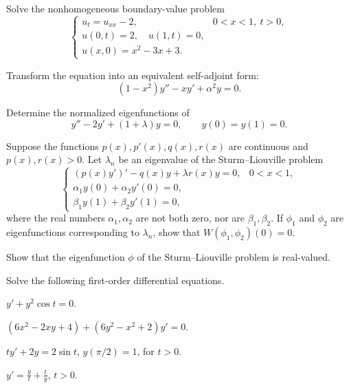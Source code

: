 \documentclass[11pt,oneside]{article}
\begin{document}
\begin{problem}
Solve the nonhomogeneous boundary-value problem
\[\begin{cases}u_t=u_{xx}-2,&0<x<1,\ t>0,\\u(0,t)=2,\quad u(1,t)=0,\\u(x,0)=x^2-3x+3.\end{cases}\]
\end{problem}

\begin{problem}
\begin{problemsubparts}
\item Transform the equation into an equivalent self-adjoint form:
\[(1-x^2)y''-xy'+\alpha^2y=0.\]
\item Determine the normalized eigenfunctions of
\[y''-2y'+(1+\lambda)y=0,\qquad y(0)=y(1)=0.\]
\end{problemsubparts}
\end{problem}

\begin{problem}
\begin{problemsubparts}
\item Suppose the functions $p(x),p'(x),q(x),r(x)$ are continuous and $p(x),r(x)>0$. Let $\lambda_n$ be an eigenvalue of the Sturm--Liouville problem
\[\begin{cases}(p(x)y')'-q(x)y+\lambda r(x)y=0,&0<x<1,\\\alpha_1y(0)+\alpha_2y'(0)=0,\\\beta_1y(1)+\beta_2y'(1)=0,\end{cases}\]
where the real numbers $\alpha_1,\alpha_2$ are not both zero, nor are $\beta_1,\beta_2$. If $\phi_1$ and $\phi_2$ are eigenfunctions corresponding to $\lambda_n$, show that $W(\phi_1,\phi_2)(0)=0$.
\item Show that the eigenfunction $\phi$ of the Sturm--Liouville problem is real-valued.
\end{problemsubparts}
\end{problem}

\begin{problem}
Solve the following first-order differential equations.
\begin{problemsubparts}
\item $y'+y^2\cos t=0$.
\item $(6x^2-2xy+4)+(6y^2-x^2+2)y'=0$.
\item $ty'+2y=2\sin t$, $y(\pi/2)=1$, for $t>0$.
\item $\displaystyle y'=\frac yt+\frac ty$, $t>0$.
\end{problemsubparts}
\end{problem}
\end{document}
